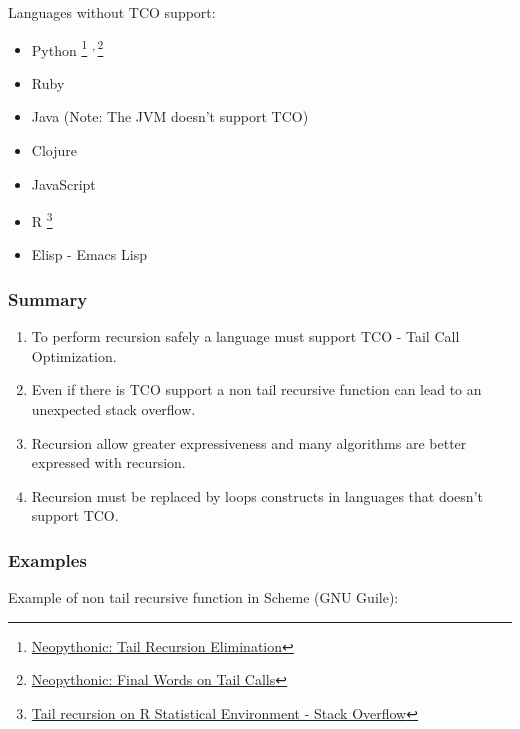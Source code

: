 \documentclass[11pt]{article}
\begin{document}
Languages without TCO support: 

\begin{itemize}
\item Python \footnote{\href{http://neopythonic.blogspot.com.au/2009/04/tail-recursion-elimination.html}{Neopythonic: Tail Recursion Elimination}} \textsuperscript{,}\,\footnote{\href{http://neopythonic.blogspot.com.au/2009/04/final-words-on-tail-calls.html}{Neopythonic: Final Words on Tail Calls}}
\item Ruby
\item Java   (Note: The JVM doesn't support TCO)
\item Clojure
\item JavaScript
\item R \footnote{\href{http://stackoverflow.com/questions/13208963/tail-recursion-on-r-statistical-environment}{Tail recursion on R Statistical Environment - Stack Overflow}}
\item Elisp - Emacs Lisp
\end{itemize}

\subsubsection{Summary}
\label{sec-1-8-3}

\begin{enumerate}
\item To perform recursion safely a language must support TCO - Tail Call
Optimization.

\item Even if there is TCO support a non tail recursive function can lead
to an unexpected stack overflow.

\item Recursion allow greater expressiveness and many algorithms are
better expressed with recursion.

\item Recursion must be replaced by loops constructs in languages that
doesn't support TCO.
\end{enumerate}

\subsubsection{Examples}
\label{sec-1-8-4}

Example of non tail recursive function in Scheme (GNU Guile): 
\end{document}
